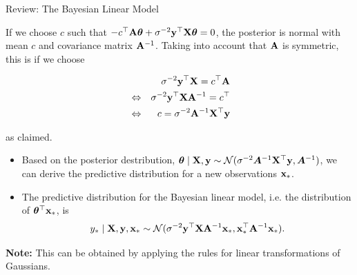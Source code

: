 \begin{frame}[c, allowframebreaks]{Review: The Bayesian Linear Model}
\begin{footnotesize}
If we choose $c$ such that $- c^\top \mathbf{A} \bm{\theta} +\sigma^{-2} \mathbf{y}^\top \mathbf{X} \bm{\theta} = 0$, the posterior is normal with mean $c$ and covariance matrix $\mathbf{A}^{-1}$. Taking into account that $\mathbf{A}$ is symmetric, this is if we choose

\vspace{-.5cm}

\begin{eqnarray*}
&& \sigma^{-2} \mathbf{y}^\top \mathbf{X} = c^\top\mathbf{A} \\
&\Leftrightarrow & \sigma^{-2} \mathbf{y}^\top \mathbf{X} \mathbf{A}^{-1} = c^\top \\
&\Leftrightarrow& c = \sigma^{-2} \mathbf{A}^{-1} \mathbf{X}^\top \mathbf{y}
\end{eqnarray*}

\vspace{-.3cm}

as claimed.

\end{footnotesize}

\framebreak

\begin{itemize}

\item Based on the posterior destribution, 
$\bm{\theta} \mid \mathbf{X}, \mathbf{y} \sim \mathcal{N}(\sigma^{-2}\bm{A}^{-1}\mathbf{X}^\top\mathbf{y}, \bm{A}^{-1})$,
we can derive the predictive distribution for a new observations $\mathbf{x}_*$.

\lz

\item The predictive distribution for the Bayesian linear model, i.e. the distribution of $\bm{\theta}^\top \mathbf{x}_*$, is
$$y_* \mid \mathbf{X}, \mathbf{y}, \mathbf{x}_* \sim \mathcal{N}(\sigma^{-2}\mathbf{y}^\top \mathbf{X} \mathbf{A}^{-1}\mathbf{x}_*, \mathbf{x}_*^\top\mathbf{A}^{-1}\mathbf{x}_*).$$
\end{itemize}

\lz

\textbf{Note:} This can be obtained by applying the rules for linear transformations of Gaussians.

\framebreak


\end{frame}

